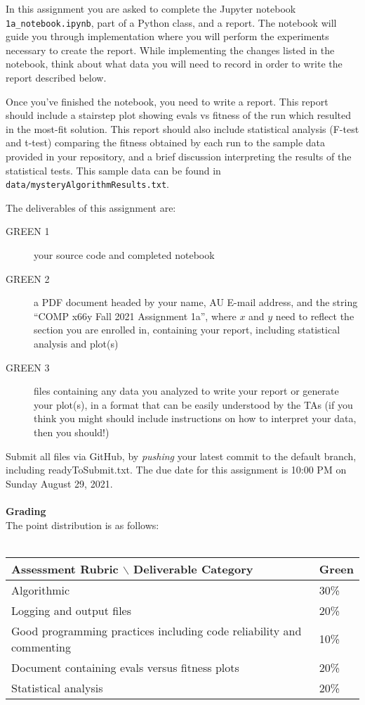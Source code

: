 \documentclass{article}
\begin{document}
In this assignment you are asked to complete the Jupyter notebook \texttt{1a\_notebook.ipynb}, part of a Python class, and a report. The notebook will guide you through implementation where you will perform the experiments necessary to create the report. While implementing the changes listed in the notebook, think about what data you will need to record in order to write the report described below.

Once you've finished the notebook, you need to write a report. This report should include a stairstep plot showing evals vs fitness of the run which resulted in the most-fit solution. This report should also include statistical analysis (F-test and t-test) comparing the fitness obtained by each run to the sample data provided in your repository, and a brief discussion interpreting the results of the statistical tests. This sample data can be found in \texttt{data/mysteryAlgorithmResults.txt}.


The deliverables of this assignment are:
\begin{description}
\item[GREEN 1] your source code and completed notebook
\item[GREEN 2] a PDF document headed by your name, AU E-mail address, and the string ``COMP x66y Fall 2021 Assignment 1a'', where $x$ and $y$ need to reflect the section you are enrolled in, containing your report, including statistical analysis and plot(s)
\item[GREEN 3] files containing any data you analyzed to write your report or generate your plot(s), in a format that can be easily understood by the TAs (if you think you might should include instructions on how to interpret your data, then you should!)
\end{description}
Submit all files via GitHub, by \emph{pushing} your latest commit to the default branch, including readyToSubmit.txt. The due date for this assignment is 10:00 PM on Sunday August 29, 2021.
\\
\\
\textbf{Grading}\\
The point distribution is as follows:\\
\\
\begin{tabular}{l|l}
    Assessment Rubric $\backslash$ Deliverable Category & Green\\ \hline \hline
	Algorithmic                                       & 30\%\\
	\hline Logging and output files            & 20\%\\
	\hline Good programming practices including code reliability and commenting & 10\%\\
	\hline Document containing evals versus fitness plots        & 20\%\\
	\hline Statistical analysis                            & 20\%\\
\end{tabular}\\
\end{document}
